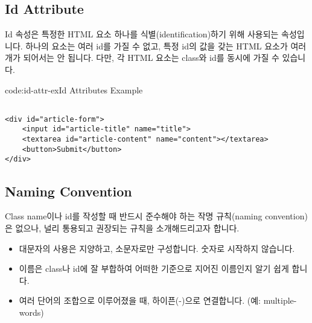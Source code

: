\subsection*{Id Attribute}
Id 속성은 특정한 HTML 요소 하나를 식별(identification)하기 위해 사용되는 속성입니다. 하나의 요소는 여러 id를 가질 수 없고, 특정 id의 값을 갖는 HTML 요소가 여러 개가 되어서는 안 됩니다. 다만, 각 HTML 요소는 class와 id를 동시에 가질 수 있습니다. 

\begin{codeenv}{code:id-attr-ex}{Id Attributes Example}\begin{verbatim}

<div id="article-form">
    <input id="article-title" name="title">
    <textarea id="article-content" name="content"></textarea>
    <button>Submit</button>
</div>
\end{verbatim}
\end{codeenv}

\subsection*{Naming Convention}
Class name이나 id를 작성할 때 반드시 준수해야 하는 작명 규칙(naming convention)은 없으나, 널리 통용되고 권장되는 규칙을 소개해드리고자 합니다.
\begin{itemize}
    \item 대문자의 사용은 지양하고, 소문자로만 구성합니다. 숫자로 시작하지 않습니다. 
    \item 이름은 class나 id에 잘 부합하여 어떠한 기준으로 지어진 이름인지 알기 쉽게 합니다. 
    \item 여러 단어의 조합으로 이루어졌을 때, 하이픈(-)으로 연결합니다. (예: multiple-words)
\end{itemize}
